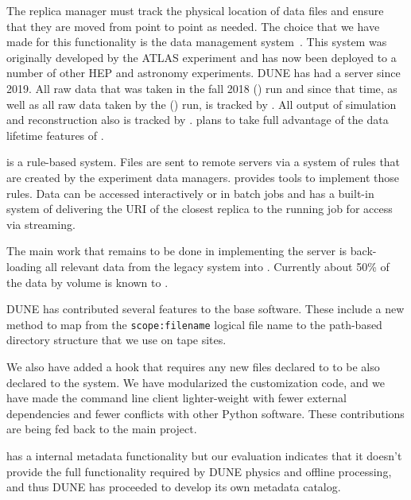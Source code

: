 \documentclass[../main-v1.tex]{subfiles}
\begin{document}
The replica manager must track the physical location of  data files %
and ensure that they 
are moved from point to point as needed. The choice  that we have made 
for this functionality is the  data
management system~\cite{Baritsis:2019csbs}.  This system was originally developed by the ATLAS experiment and has now been deployed to 
a number of other HEP and astronomy experiments.  DUNE has had a  server since 2019.  All raw data that was
taken in the fall 2018  () run and since that time, as well as all raw data taken by the  () run, is tracked by .  All output of  simulation and reconstruction also is tracked by .  plans to take full advantage of the data lifetime features of .

 is a rule-based system.  Files are sent to remote servers via a system of rules
that are created by the experiment data managers.  provides tools to implement those rules.   Data can be accessed interactively or in batch jobs and
 has a built-in system of delivering the URI of the closest replica to the running job for access via streaming.

The main work that remains to be done in implementing the  server is  back-loading all relevant 
data from the legacy  system into .  Currently about 50\% of the data by volume is known to .   

DUNE has contributed several features to the  base software.  These include a new method to map from the \texttt{scope:filename} logical file name to the path-based directory structure that we use on tape sites.  

We also have added a hook that requires any new files declared to  to be also declared to the  system.  We have modularized the  customization code, and we have made the command line client lighter-weight with fewer external dependencies and fewer conflicts with other Python software.  These contributions are being fed back to the main  project.  

 has a internal metadata functionality but our evaluation indicates that it doesn't provide the full functionality required by DUNE physics and offline processing, %
and thus DUNE has proceeded to develop its own metadata catalog. 
\end{document}
